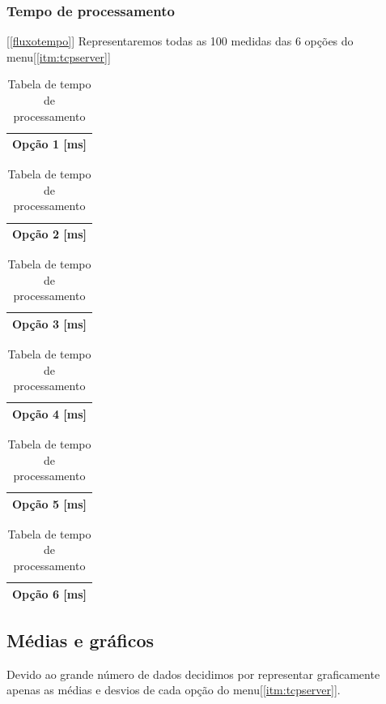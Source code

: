 \documentclass[a4paper,10pt]{article}
\begin{document}
\subsubsection{Tempo de processamento}[\ref{fluxotempo}]
Representaremos todas as 100 medidas das 6 opções do menu[\ref{itm:tcpserver}]
\begin{table}
  \tiny
  \centering
  \begin{tabular}{|c|}
    \hline
    Opção 1 [ms] \\
    \hline
    
    \hline
  \end{tabular}
  \begin{tabular}{|c|}
    \hline
    Opção 2 [ms] \\
    \hline
    
    \hline
  \end{tabular}
  \begin{tabular}{|c|}
    \hline
    Opção 3 [ms] \\
    \hline
    
    \hline
  \end{tabular}
  \begin{tabular}{|c|}
    \hline
    Opção 4 [ms] \\
    \hline
    
    \hline
  \end{tabular}
  \begin{tabular}{|c|}
    \hline
    Opção 5 [ms] \\
    \hline
    
    \hline
  \end{tabular}
  \begin{tabular}{|c|}
    \hline
    Opção 6 [ms] \\
    \hline
    
    \hline
  \end{tabular}
  \caption{Tabela de tempo de processamento}
\end{table}
\newpage
\subsection{Médias e gráficos}
Devido ao grande número de dados decidimos por representar graficamente apenas as
médias e desvios de cada opção do menu[\ref{itm:tcpserver}].\\
\end{document}
